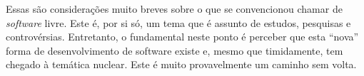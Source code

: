 Essas são considerações muito breves sobre o que se convencionou chamar
de \textit{software} livre. Este é, por si só, um tema que é assunto de estudos, pesquisas
e controvérsias. Entretanto, o fundamental neste ponto é perceber que esta ``nova'' forma
de desenvolvimento de software existe e, mesmo que timidamente, tem chegado à temática
nuclear. Este é muito provavelmente um caminho sem volta.

